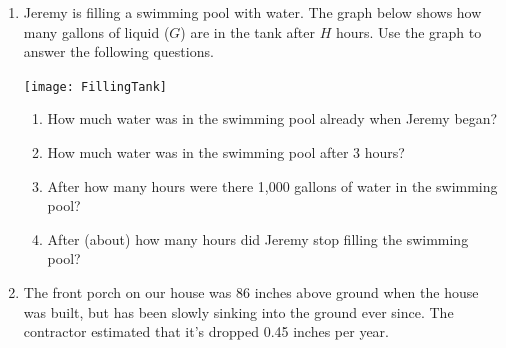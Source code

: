 \documentclass[12pt]{article}
\begin{document}
\hrulefill


\newpage
\begin{enumerate}
\item Jeremy is filling a swimming pool with water.  The graph below shows how many gallons of liquid ($G$) are in the tank after $H$ hours.  Use the graph to answer the following questions.

\begin{center}
 {\texttt{[image: FillingTank]}}
\end{center}



\begin{enumerate}
\item How much water was in the swimming pool already when Jeremy began?
\vfill
\item How much water was in the swimming pool after 3 hours?
\vfill
\item After how many hours were there 1,000 gallons of water in the swimming pool?
\vfill
\item After (about) how many hours did Jeremy stop filling the swimming pool?
\vfill
\end{enumerate}

\newpage


\item  The front porch on our house was 86 inches above ground when the house was built, but has been slowly sinking into the ground ever since.  The contractor estimated that it's dropped 0.45 inches per year.


\end{enumerate}
\end{document}
